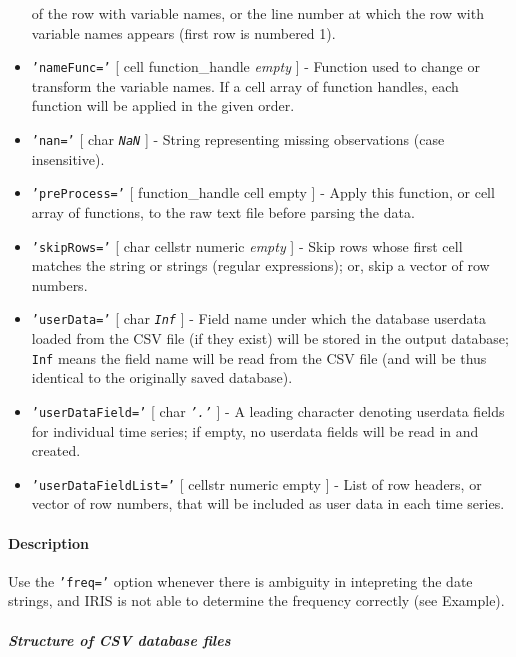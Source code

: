 \begin{itemize}
   of the row with variable names, or the line number at which the row
   with variable names appears (first row is numbered 1).
 \item
   \texttt{'nameFunc='} {[} cell \textbar{} function\_handle \textbar{}
   \emph{empty} {]} - Function used to change or transform the variable
   names. If a cell array of function handles, each function will be
   applied in the given order.
 \item
   \texttt{'nan='} {[} char \textbar{} \emph{\texttt{NaN}} {]} - String
   representing missing observations (case insensitive).
 \item
   \texttt{'preProcess='} {[} function\_handle \textbar{} cell \textbar{}
   empty {]} - Apply this function, or cell array of functions, to the
   raw text file before parsing the data.
 \item
   \texttt{'skipRows='} {[} char \textbar{} cellstr \textbar{} numeric
   \textbar{} \emph{empty} {]} - Skip rows whose first cell matches the
   string or strings (regular expressions); or, skip a vector of row
   numbers.
 \item
   \texttt{'userData='} {[} char \textbar{} \emph{\texttt{Inf}} {]} -
   Field name under which the database userdata loaded from the CSV file
   (if they exist) will be stored in the output database; \texttt{Inf}
   means the field name will be read from the CSV file (and will be thus
   identical to the originally saved database).
 \item
   \texttt{'userDataField='} {[} char \textbar{} \emph{\texttt{'.'}} {]}
   - A leading character denoting userdata fields for individual time
   series; if empty, no userdata fields will be read in and created.
 \item
   \texttt{'userDataFieldList='} {[} cellstr \textbar{} numeric
   \textbar{} empty {]} - List of row headers, or vector of row numbers,
   that will be included as user data in each time series.
 \end{itemize}
 
 \paragraph{Description}
 
 Use the \texttt{'freq='} option whenever there is ambiguity in
 intepreting the date strings, and IRIS is not able to determine the
 frequency correctly (see Example).
 
 \subparagraph{Structure of CSV database files}
 
